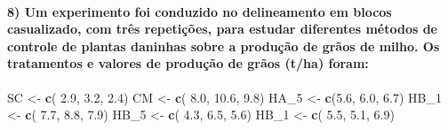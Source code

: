 \documentclass[
]{article}
\newenvironment{Shaded}{\begin{snugshade}}{\end{snugshade}}
\newcommand{\FloatTok}[1]{\textcolor[rgb]{0.00,0.00,0.81}{#1}}
\newcommand{\FunctionTok}[1]{\textcolor[rgb]{0.13,0.29,0.53}{\textbf{#1}}}
\newcommand{\NormalTok}[1]{#1}
\newcommand{\OtherTok}[1]{\textcolor[rgb]{0.56,0.35,0.01}{#1}}
\begin{document}
\hypertarget{um-experimento-foi-conduzido-no-delineamento-em-blocos-casualizado-com-truxeas-repetiuxe7uxf5es-para-estudar-diferentes-muxe9todos-de-controle-de-plantas-daninhas-sobre-a-produuxe7uxe3o-de-gruxe3os-de-milho.-os-tratamentos-e-valores-de-produuxe7uxe3o-de-gruxe3os-tha-foram}{%
\paragraph{8) Um experimento foi conduzido no delineamento em blocos
casualizado, com três repetições, para estudar diferentes métodos de
controle de plantas daninhas sobre a produção de grãos de milho. Os
tratamentos e valores de produção de grãos (t/ha)
foram:}\label{um-experimento-foi-conduzido-no-delineamento-em-blocos-casualizado-com-truxeas-repetiuxe7uxf5es-para-estudar-diferentes-muxe9todos-de-controle-de-plantas-daninhas-sobre-a-produuxe7uxe3o-de-gruxe3os-de-milho.-os-tratamentos-e-valores-de-produuxe7uxe3o-de-gruxe3os-tha-foram}}

\begin{Shaded}
\begin{Highlighting}[]
\NormalTok{SC }\OtherTok{\textless{}{-}} \FunctionTok{c}\NormalTok{( }\FloatTok{2.9}\NormalTok{, }\FloatTok{3.2}\NormalTok{, }\FloatTok{2.4}\NormalTok{)}
\NormalTok{CM }\OtherTok{\textless{}{-}} \FunctionTok{c}\NormalTok{( }\FloatTok{8.0}\NormalTok{, }\FloatTok{10.6}\NormalTok{, }\FloatTok{9.8}\NormalTok{)}
\NormalTok{HA\_5 }\OtherTok{\textless{}{-}} \FunctionTok{c}\NormalTok{(}\FloatTok{5.6}\NormalTok{, }\FloatTok{6.0}\NormalTok{, }\FloatTok{6.7}\NormalTok{)}
\NormalTok{HB\_1 }\OtherTok{\textless{}{-}} \FunctionTok{c}\NormalTok{( }\FloatTok{7.7}\NormalTok{, }\FloatTok{8.8}\NormalTok{, }\FloatTok{7.9}\NormalTok{)}
\NormalTok{HB\_5 }\OtherTok{\textless{}{-}} \FunctionTok{c}\NormalTok{( }\FloatTok{4.3}\NormalTok{, }\FloatTok{6.5}\NormalTok{, }\FloatTok{5.6}\NormalTok{)}
\NormalTok{HB\_1 }\OtherTok{\textless{}{-}} \FunctionTok{c}\NormalTok{( }\FloatTok{5.5}\NormalTok{, }\FloatTok{5.1}\NormalTok{, }\FloatTok{6.9}\NormalTok{)}
\end{Highlighting}
\end{Shaded}
\end{document}
